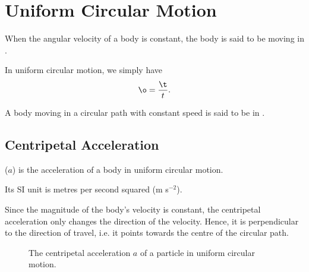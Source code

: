 \section{Uniform Circular Motion}

\begin{definition}
    When the angular velocity of a body is constant, the body is said to be moving in .
\end{definition}

In uniform circular motion, we simply have \[\o = \frac{\t}{t}.\]

\begin{definition}
    A body moving in a circular path with constant speed is said to be in .
\end{definition}

\subsection{Centripetal Acceleration}

\begin{definition}
     ($a$) is the acceleration of a body in uniform circular motion.
\end{definition}

Its SI unit is metres per second squared (m s$^{-2}$).

Since the magnitude of the body's velocity is constant, the centripetal acceleration only changes the direction of the velocity. Hence, it is perpendicular to the direction of travel, i.e. it points towards the centre of the circular path.

\begin{figure}[H]
    \centering
    \caption{The centripetal acceleration $a$ of a particle in uniform circular motion.}
\end{figure}

